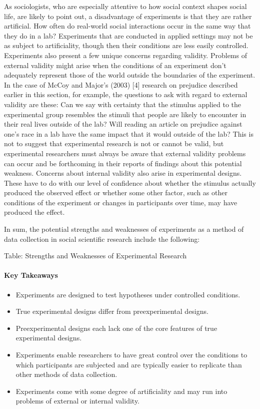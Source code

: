 As sociologists, who are especially attentive to how social context shapes social life, are likely to point out, a disadvantage of experiments is that they are rather artificial. How often do real-world social interactions occur in the same way that they do in a lab? Experiments that are conducted in applied settings may not be as subject to artificiality, though then their conditions are less easily controlled. Experiments also present a few unique concerns regarding validity. Problems of external validity might arise when the conditions of an experiment don’t adequately represent those of the world outside the boundaries of the experiment. In the case of McCoy and Major’s (2003) [4] research on prejudice described earlier in this section, for example, the questions to ask with regard to external validity are these: Can we say with certainty that the stimulus applied to the experimental group resembles the stimuli that people are likely to encounter in their real lives outside of the lab? Will reading an article on prejudice against one’s race in a lab have the same impact that it would outside of the lab? This is not to suggest that experimental research is not or cannot be valid, but experimental researchers must always be aware that external validity problems can occur and be forthcoming in their reports of findings about this potential weakness. Concerns about internal validity also arise in experimental designs. These have to do with our level of confidence about whether the stimulus actually produced the observed effect or whether some other factor, such as other conditions of the experiment or changes in participants over time, may have produced the effect.

In sum, the potential strengths and weaknesses of experiments as a method of data collection in social scientific research include the following:

Table: Strengths and Weaknesses of Experimental Research

\paragraph{Key Takeaways}

\begin{itemize}
	\setlength{\itemsep}{0pt}
	\setlength{\parskip}{0pt}
	\setlength{\parsep}{0pt}
	
	\item Experiments are designed to test hypotheses under controlled conditions.
	\item True experimental designs differ from preexperimental designs.
	\item Preexperimental designs each lack one of the core features of true experimental designs.
	\item Experiments enable researchers to have great control over the conditions to which participants are subjected and are typically easier to replicate than other methods of data collection.
	\item Experiments come with some degree of artificiality and may run into problems of external or internal validity.
	
\end{itemize}

